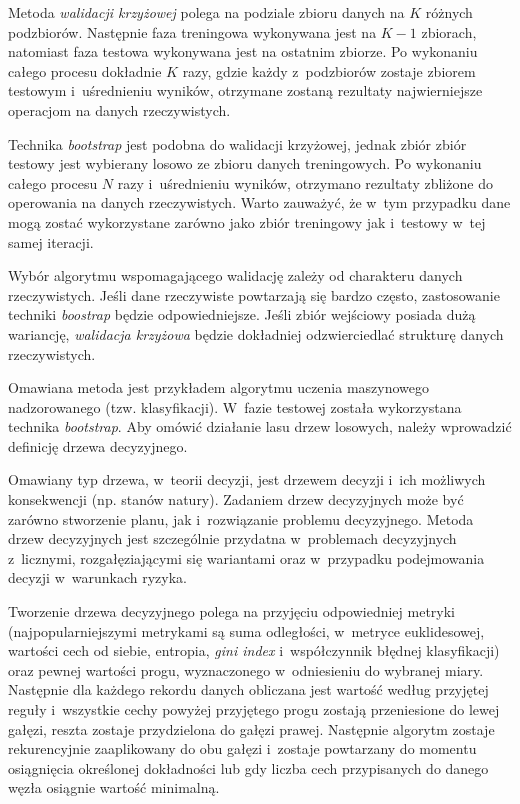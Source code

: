     Metoda \textit{walidacji krzyżowej} polega na podziale zbioru danych na $K$ różnych podzbiorów. Następnie faza treningowa wykonywana jest na $K-1$ zbiorach, natomiast faza testowa wykonywana jest na ostatnim zbiorze. Po wykonaniu całego procesu dokładnie $K$ razy, gdzie każdy z~podzbiorów zostaje zbiorem testowym i~uśrednieniu wyników, otrzymane zostaną rezultaty najwierniejsze operacjom na danych rzeczywistych.

    Technika \textit{bootstrap} jest podobna do walidacji krzyżowej, jednak zbiór zbiór testowy jest wybierany losowo ze zbioru danych treningowych. Po wykonaniu całego procesu $N$ razy i~uśrednieniu wyników, otrzymano rezultaty zbliżone do operowania na danych rzeczywistych. Warto zauważyć, że w~tym przypadku dane mogą zostać wykorzystane zarówno jako zbiór treningowy jak i~testowy w~tej samej iteracji.

    Wybór algorytmu wspomagającego walidację zależy od charakteru danych rzeczywistych. Jeśli dane rzeczywiste powtarzają się bardzo często, zastosowanie techniki \textit{boostrap} będzie odpowiedniejsze. Jeśli zbiór wejściowy posiada dużą wariancję, \textit{walidacja krzyżowa} będzie dokładniej odzwierciedlać strukturę danych rzeczywistych.

    Omawiana metoda jest przykładem algorytmu uczenia maszynowego nadzorowanego (tzw. klasyfikacji). W~fazie testowej została wykorzystana technika \textit{bootstrap}. Aby omówić działanie lasu drzew losowych, należy wprowadzić definicję drzewa decyzyjnego.

    Omawiany typ drzewa, w~teorii decyzji, jest drzewem decyzji i~ich możliwych konsekwencji (np. stanów natury). Zadaniem drzew decyzyjnych może być zarówno stworzenie planu, jak i~rozwiązanie problemu decyzyjnego. Metoda drzew decyzyjnych jest szczególnie przydatna w~problemach decyzyjnych z~licznymi, rozgałęziającymi się wariantami oraz w~przypadku podejmowania decyzji w~warunkach ryzyka.

    Tworzenie drzewa decyzyjnego polega na przyjęciu odpowiedniej metryki (najpopularniejszymi metrykami są suma odległości, w~metryce euklidesowej, wartości cech od siebie, entropia, \textit{gini index} i~współczynnik błędnej klasyfikacji) oraz pewnej wartości progu, wyznaczonego w~odniesieniu do wybranej miary. Następnie dla każdego rekordu danych obliczana jest wartość według przyjętej reguły i~wszystkie cechy powyżej przyjętego progu zostają przeniesione do lewej gałęzi, reszta zostaje przydzielona do gałęzi prawej. Następnie algorytm zostaje rekurencyjnie zaaplikowany do obu gałęzi i~zostaje powtarzany do momentu osiągnięcia określonej dokładności lub gdy liczba cech przypisanych do danego węzła osiągnie wartość minimalną.

